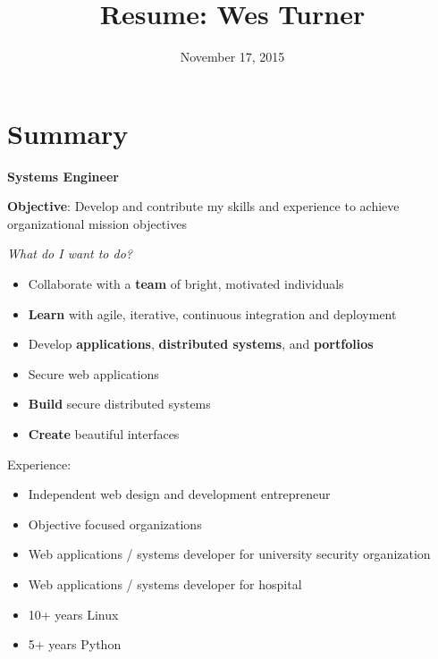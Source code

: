 \documentclass[letter,,openany,oneside]{sphinxhowto}
\title{Resume: Wes Turner}
\date{November 17, 2015}
\author{}
\begin{document}
\maketitle
\tableofcontents
{}\label{resume::doc}

\newpage

\section{Summary}
\label{resume:summary}\label{resume:id1}
\textbf{Systems Engineer}

\textbf{Objective}: Develop and contribute my skills and experience to
achieve organizational mission objectives

\emph{What do I want to do?}
\begin{itemize}
\item {} 
Collaborate with a \textbf{team} of bright, motivated individuals

\item {} 
\textbf{Learn} with agile, iterative, continuous integration and deployment

\item {} 
Develop \textbf{applications}, \textbf{distributed systems}, and \textbf{portfolios}

\item {} 
Secure web applications

\item {} 
\textbf{Build} secure distributed systems

\item {} 
\textbf{Create} beautiful interfaces

\end{itemize}

Experience:
\begin{itemize}
\item {} 
Independent web design and development entrepreneur

\item {} 
Objective focused organizations

\item {} 
Web applications / systems developer for university security organization

\item {} 
Web applications / systems developer for hospital

\item {} 
10+ years Linux

\item {} 
5+ years Python

\end{itemize}
\end{document}
